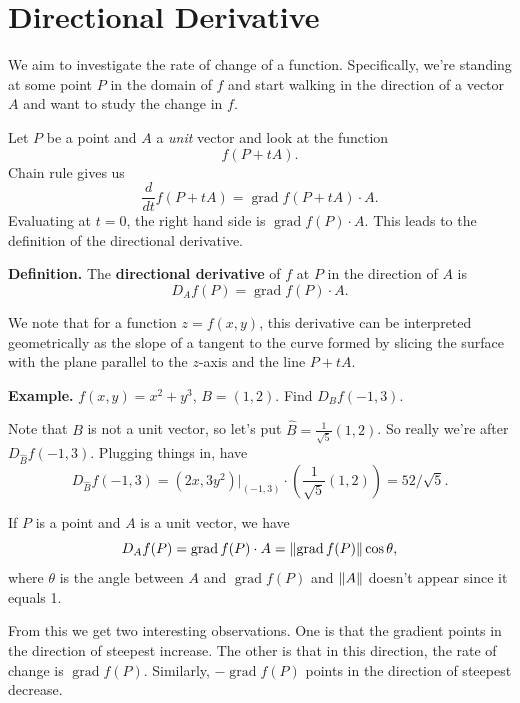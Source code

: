 \documentclass{article}
\DeclareMathOperator{\grd}{grad}
\begin{document}
 \section*{Directional Derivative}

We aim to investigate the rate of change of a function. 
Specifically, we're standing at some point $P$ in the domain of $f$
and start walking in the direction of a vector $A$ and want
to study the change in $f$. 

Let $P$ be a point and $A$ a \emph{unit} vector and look at the function
\[f(P+tA).\]
Chain rule gives us
\[\frac{d}{dt} f(P+tA) = \grd f (P+tA) \cdot A.\]
Evaluating at $t=0$, the right hand side is $\grd f(P) \cdot A$.
This leads to the definition of the directional derivative.

\textbf{Definition.} The \textbf{directional derivative} of $f$
at $P$ in the direction of $A$ is 
\[D_A f (P)= \grd f (P) \cdot A.\]

We note that for a function $z=f(x,y)$, this derivative can be 
interpreted geometrically as the slope of a tangent to the curve
formed by slicing the surface with the plane parallel to the $z$-axis
and the line $P+tA$.

\textbf{Example.} $f(x,y) = x^2 + y^3$, $B=(1,2)$. Find 
$D_B f (-1,3)$.

Note that $B$ is not a unit vector, so let's put 
$\hat{B} = \frac{1}{\sqrt{5}}(1,2)$. So really we're after $D_{\hat{B}} f (-1,3)$.
Plugging things in, have
\[D_{\hat{B}} f (-1,3) = (2x,3y^2)\bigg\vert_{(-1,3)} \cdot \left( \frac{1}{\sqrt{5}}(1,2) \right) = 52/\sqrt{5}. \]

If $P$ is a point and $A$ is a unit vector, we have
\[D_A f (P)= \grd f (P) \cdot A = \norm{\grd f(P)}\cos\theta,\]
where $\theta$ is the angle between $A$ and $\grd f(P)$ and $\norm{A}$
doesn't appear since it equals 1.

From this we get two interesting observations. One is that
the gradient points in the direction of steepest increase. The other
is that in this direction, the rate of change is $\grd f (P)$.
Similarly, $-\grd f(P)$ points in the direction of steepest decrease.
\end{document}
